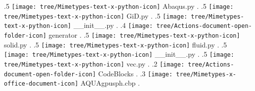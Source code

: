 {.5 { \texttt{[image: tree/Mimetypes-text-x-python-icon]} Abaqus.py }.
.5 { \texttt{[image: tree/Mimetypes-text-x-python-icon]} GiD.py }.
.5 { \texttt{[image: tree/Mimetypes-text-x-python-icon]} \_\_init\_\_.py }.
.4 { \texttt{[image: tree/Actions-document-open-folder-icon]} generator }.
.5 { \texttt{[image: tree/Mimetypes-text-x-python-icon]} solid.py }.
.5 { \texttt{[image: tree/Mimetypes-text-x-python-icon]} fluid.py }.
.5 { \texttt{[image: tree/Mimetypes-text-x-python-icon]} \_\_init\_\_.py }.
.5 { \texttt{[image: tree/Mimetypes-text-x-python-icon]} vec.py }.
.2 { \texttt{[image: tree/Actions-document-open-folder-icon]} CodeBlocks }.
.3 { \texttt{[image: tree/Mimetypes-x-office-document-icon]} AQUAgpusph.cbp }.
}


